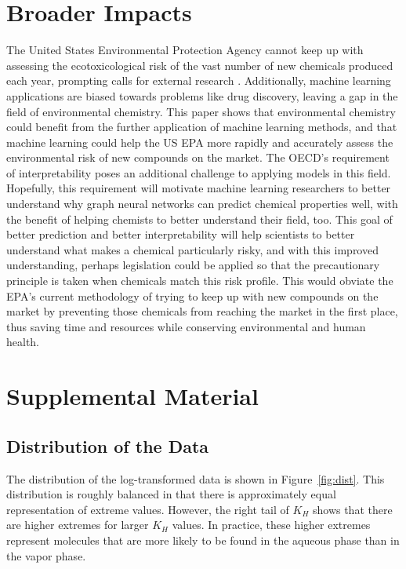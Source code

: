 \documentclass[12pt, oneside]{article}   	%
\begin{document}
\newpage

{}



\newpage
\section{Broader Impacts}
The United States Environmental Protection Agency cannot keep up with assessing the ecotoxicological risk of the vast number of new chemicals produced each year, prompting calls for external research \cite{burton}. Additionally, machine learning applications are biased towards problems like drug discovery, leaving a gap in the field of environmental chemistry. This paper shows that environmental chemistry could benefit from the further application of machine learning methods, and that machine learning could help the US EPA more rapidly and accurately assess the environmental risk of new compounds on the market. The OECD's requirement of interpretability poses an additional challenge to applying models in this field. Hopefully, this requirement will motivate machine learning researchers to better understand why graph neural networks can predict chemical properties well, with the benefit of helping chemists to better understand their field, too. This goal of better prediction and better interpretability will help scientists to better understand what makes a chemical particularly risky, and with this improved understanding, perhaps legislation could be applied so that the precautionary principle is taken when chemicals match this risk profile. This would obviate the EPA's current methodology of trying to keep up with new compounds on the market by preventing those chemicals from reaching the market in the first place, thus saving time and resources while conserving environmental and human health.


\newpage
\section{Supplemental Material}
\subsection{Distribution of the Data}
The distribution of the log-transformed data is shown in Figure~\ref{fig:dist}. This distribution is roughly balanced in that there is approximately equal representation of extreme values. However, the right tail of $K_H$ shows that there are higher extremes for larger $K_H$ values. In practice, these higher extremes represent molecules that are more likely to be found in the aqueous phase than in the vapor phase. 
\end{document}
